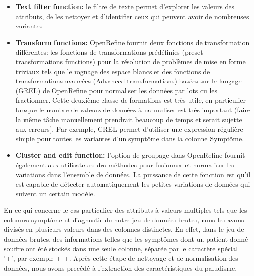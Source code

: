 \begin{itemize}
\item \textbf{Text filter function:} le filtre de texte permet d’explorer les valeurs des attributs, de les nettoyer et d’identifier ceux qui peuvent avoir de nombreuses variantes.
\item \textbf{Transform functions:} OpenRefine fournit deux fonctions de transformation différentes: les fonctions de transformations prédéfinies (preset transformations functions) pour la résolution de problèmes de mise en forme triviaux tels que le rognage des espace blancs et des fonctions de transformations avancées (Advanced transformations) basées sur le langage (GREL) de OpenRefine pour normaliser les données par lots ou les fractionner. Cette deuxième classe de formations est très utile, en particulier lorsque le nombre de valeurs de données à normaliser est très important (faire la même tâche manuellement prendrait beaucoup de temps et serait sujette aux erreurs). Par exemple, GREL permet d’utiliser une expression régulière simple pour toutes les variantes d'un symptôme dans la colonne Symptôme.
\item \textbf{Cluster and edit function:} l'option de groupage dans OpenRefine fournit également aux utilisateurs des méthodes pour fusionner et normaliser les variations dans l'ensemble de données. La puissance de cette fonction est qu'il est capable de détecter automatiquement les petites variations de données qui suivent un certain modèle.
\end{itemize}
En ce qui concerne le cas particulier des attributs à valeurs multiples tels que les colonnes symptôme et diagnostic de notre jeu de données brutes, nous les avons divisés en plusieurs valeurs dans des colonnes distinctes. En effet, dans le jeu de données brutes, des informations telles que les symptômes dont un patient donné souffre ont été stockés dans une seule colonne, séparée par le caractère spécial '+', par exemple + +.
Après cette étape de nettoyage et de normalisation des données, nous avons procédé à l'extraction des caractéristiques du paludisme.
